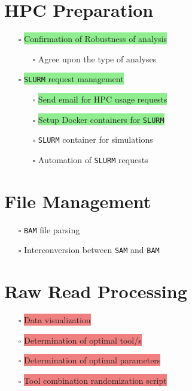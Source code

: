 \documentclass[11pt]{report}
\newcommand{\pending}{$\square$}
\newcommand{\highlightessential}[1]{\colorbox{lightgreen}{#1}}
\newcommand{\highlightoptional}[1]{\colorbox{lightorange}{#1}}
\newcommand{\highlightrobust}[1]{\colorbox{lightcoral}{#1}}
\begin{document}
\begin{multicols}{2}
\section*{HPC Preparation}
\begin{itemize}
		\item [\pending] \highlightessential{Confirmation of Robustness of analysis}
		\begin{itemize}
			\item [\pending] Agree upon the type of analyses
		\end{itemize}
		\item [\pending] \highlightessential{\texttt{SLURM} request management}
		\begin{itemize}
			\item [\pending] \highlightessential{Send email for HPC usage requests}
			\item [\pending] \highlightessential{Setup Docker containers for \texttt{SLURM}}
			\item [\pending] \highlightoptional{\texttt{SLURM} container for simulations}
			\item [\pending] \highlightoptional{Automation of \texttt{SLURM} requests}
		\end{itemize}
\end{itemize}
		
		\section*{File Management}
		\begin{itemize}
			\item [\pending] \highlightoptional{\texttt{BAM} file parsing}
			\item [\pending] \highlightoptional{Interconversion between \texttt{SAM} and \texttt{BAM}}
		\end{itemize}
		
		\section*{Raw Read Processing}
		\begin{itemize}
			\item [\pending] \highlightrobust{Data visualization}
			\item [\pending] \highlightrobust{Determination of optimal tool/s}
			\item [\pending] \highlightrobust{Determination of optimal parameters}
			\item [\pending] \highlightrobust{Tool combination randomization script}
		\end{itemize}
		

\end{multicols}
\end{document}
